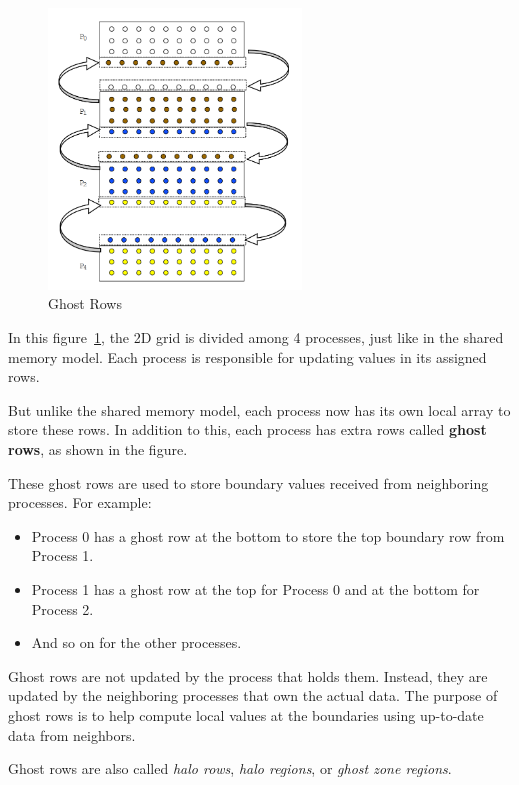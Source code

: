 \documentclass[12pt]{book}
\begin{document}
\begin{figure}[H]
    \centering
    \includegraphics[width=0.6\textwidth]{images/ghost.png}
    \caption{Ghost Rows}
    \label{fig:ghost}
\end{figure}

In this figure~\ref{fig:ghost}, the 2D grid is divided among 4 processes, just like in the shared memory model. Each process is responsible for updating values in its assigned rows.

But unlike the shared memory model, each process now has its own local array to store these rows. In addition to this, each process has extra rows called \textbf{ghost rows}, as shown in the figure.

These ghost rows are used to store boundary values received from neighboring processes. For example:
\begin{itemize}
    \item Process 0 has a ghost row at the bottom to store the top boundary row from Process 1.
    \item Process 1 has a ghost row at the top for Process 0 and at the bottom for Process 2.
    \item And so on for the other processes.
\end{itemize}

Ghost rows are not updated by the process that holds them. Instead, they are updated by the neighboring processes that own the actual data. The purpose of ghost rows is to help compute local values at the boundaries using up-to-date data from neighbors.

Ghost rows are also called \textit{halo rows}, \textit{halo regions}, or \textit{ghost zone regions}.
\end{document}
